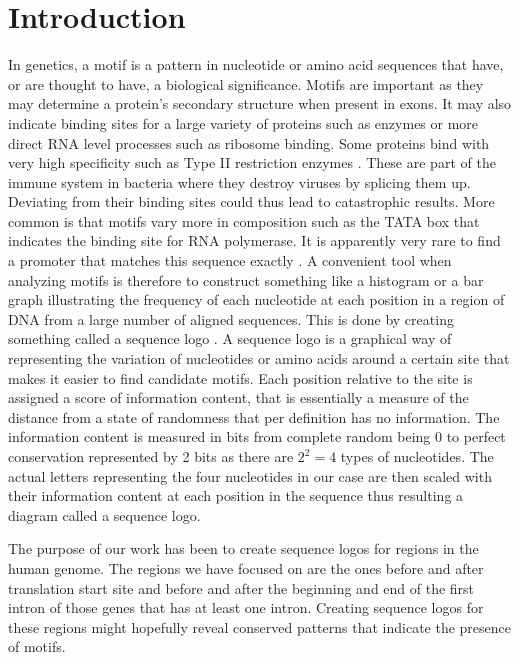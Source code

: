 \documentclass[10pt,letterpaper]{article}
\begin{document}
\section*{Introduction}
In genetics, a motif is a pattern in nucleotide or amino acid sequences that have, or are thought to have, a biological significance. Motifs are important as they may determine a protein's secondary structure when present in exons. It may also indicate binding sites for a large variety of proteins such as enzymes or more direct RNA level processes such as ribosome binding. Some proteins bind with very high specificity such as Type II restriction enzymes \cite{bib1}. These are part of the immune system in bacteria where they destroy viruses by splicing them up. Deviating from their binding sites could thus lead to catastrophic results. More common is that motifs vary more in composition such as the TATA box that indicates the binding site for RNA polymerase. It is apparently very rare to find a promoter that matches this sequence exactly \cite{bib1}. A convenient tool when analyzing motifs is therefore to construct something like a histogram or a bar graph illustrating the frequency of each nucleotide at each position in a region of DNA from a large number of aligned sequences. This is done by creating something called a sequence logo \cite{bib2}. A sequence logo is a graphical way of representing the variation of nucleotides or amino acids around a certain site that makes it easier to find candidate motifs. Each position relative to the site is assigned a score of information content, that is essentially a measure of the distance from a state of randomness that per definition has no information. The information content is measured in bits from complete random being 0 to perfect conservation represented by 2 bits as there are $2^2=4$ types of nucleotides. The actual letters representing the four nucleotides in our case are then scaled with their information content at each position in the sequence thus resulting a diagram called a sequence logo.

The purpose of our work has been to create sequence logos for regions in the human genome. The regions we have focused on are the ones before and after translation start site and before and after the beginning and end of the first intron of those genes that has at least one intron. Creating sequence logos for these regions might hopefully reveal conserved patterns that indicate the presence of motifs.

\end{document}
